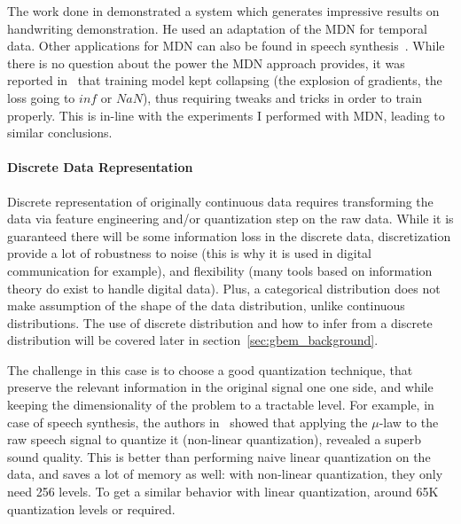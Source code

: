       \par The work done in \citet{graves2013generating} demonstrated a system which generates impressive results on handwriting demonstration. He used an adaptation of the MDN for temporal data. Other applications for MDN can also be found in speech synthesis~\citep{zen2014deep,wang2016gating,Wang2017AnAR}. While there is no question about the power the MDN approach provides, it was reported in~\citep{graves2013generating} that training model kept collapsing (the explosion of gradients, the loss going to $inf$ or $NaN$), thus requiring tweaks and tricks in order to train properly. This is in-line with the experiments I performed with MDN, leading to similar conclusions.
    \paragraph{Discrete Data Representation}
      \par Discrete representation of originally continuous data requires transforming the data via feature engineering and/or quantization step on the raw data. While it is guaranteed there will be some information loss in the discrete data, discretization provide a lot of robustness to noise (this is why it is used in digital communication for example), and flexibility (many tools based on information theory do exist to handle digital data). Plus, a categorical distribution does not make assumption of the shape of the data distribution, unlike continuous distributions. The use of discrete distribution and how to infer from a discrete distribution will be covered later in section~\ref{sec:gbem_background}.

      \par The challenge in this case is to choose a good quantization technique, that preserve the relevant information in the original signal one one side, and while keeping the dimensionality of the problem to a tractable level. For example, in case of speech synthesis, the authors in~\citep{oord2016pixel,oord2016wavenet} showed that applying the $\mu$-law to the raw speech signal to quantize it (non-linear quantization), revealed a superb sound quality. This is better than performing naive linear quantization on the data, and saves a lot of memory as well: with non-linear quantization, they only need 256 levels. To get a similar behavior with linear quantization, around 65K quantization levels or required.

